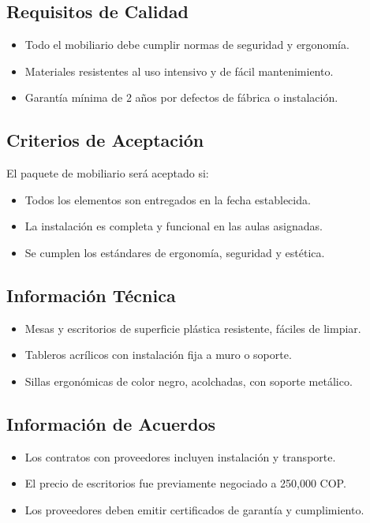 \subsection{Requisitos de Calidad}

\begin{itemize}
    \item Todo el mobiliario debe cumplir normas de seguridad y ergonomía.
    \item Materiales resistentes al uso intensivo y de fácil mantenimiento.
    \item Garantía mínima de 2 años por defectos de fábrica o instalación.
\end{itemize}

\subsection{Criterios de Aceptación}

El paquete de mobiliario será aceptado si:
\begin{itemize}
    \item Todos los elementos son entregados en la fecha establecida.
    \item La instalación es completa y funcional en las aulas asignadas.
    \item Se cumplen los estándares de ergonomía, seguridad y estética.
\end{itemize}

\subsection{Información Técnica}

\begin{itemize}
    \item Mesas y escritorios de superficie plástica resistente, fáciles de limpiar.
    \item Tableros acrílicos con instalación fija a muro o soporte.
    \item Sillas ergonómicas de color negro, acolchadas, con soporte metálico.
\end{itemize}

\subsection{Información de Acuerdos}

\begin{itemize}
    \item Los contratos con proveedores incluyen instalación y transporte.
    \item El precio de escritorios fue previamente negociado a 250,000 COP.
    \item Los proveedores deben emitir certificados de garantía y cumplimiento.
\end{itemize}
